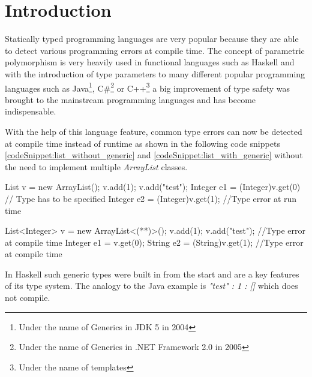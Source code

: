 \section{Introduction}\label{section:introduction}
Statically typed programming languages are very popular because they are able to detect various programming errors at compile time.
The concept of parametric polymorphism is very heavily used in functional languages such as Haskell and with the introduction of type parameters to many different popular programming languages such as Java\footnote{Under the name of Generics in JDK 5 in 2004\cite{JDK5}},
 C\#\footnote{Under the name of Generics in .NET Framework 2.0 in 2005\cite{dotnet20}} or C++\footnote{Under the name of templates} a big improvement of type safety was brought to the mainstream programming languages and has become indispensable.

With the help of this language feature, common type errors can now be detected at compile time instead of runtime as shown in the following code snippets \ref{codeSnippet:list_without_generic} and \ref{codeSnippet:list_with_generic} without the need to implement multiple \emph{ArrayList} classes.

\begin{adjustbox}{width=\columnwidth}
\begin{codesnippet}[caption={List without generic argument in Java}, label={codeSnippet:list_without_generic}]
List v = new ArrayList();
v.add(1);
v.add("test");
Integer e1 = (Integer)v.get(0) // Type has to be specified
Integer e2 = (Integer)v.get(1); //Type error at run time
\end{codesnippet}
\end{adjustbox}
\begin{adjustbox}{width=\columnwidth}
\begin{codesnippet}[escapeinside={(*}{*)}, caption={List with type argument in Java}, label={codeSnippet:list_with_generic}]
List<Integer> v = new ArrayList<(**)>();
v.add(1);
v.add("test"); //Type error at compile time
Integer e1 = v.get(0);
String e2 = (String)v.get(1); //Type error at compile time
\end{codesnippet}
\end{adjustbox}
\linebreak

In Haskell such generic types were built in from the start and are a key features of its type system. The analogy to the Java example is \emph{"test" : 1 : []} which does not compile.

